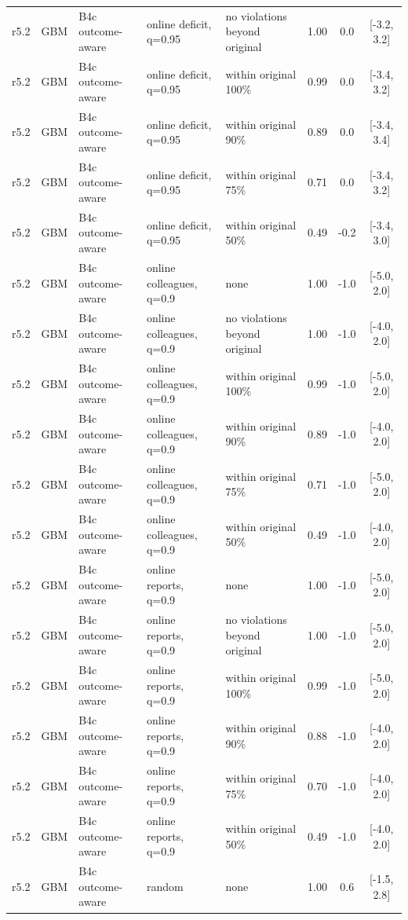 \documentclass[10pt,onecolumn,letterpaper]{article}
\begin{document}
\begin{longtable}{lllp{4.2cm}p{3.4cm}ccc}
r5.2 & GBM & B4c outcome-aware & online deficit, q=0.95 & no violations beyond original & 1.00 & 0.0 & [-3.2, 3.2] \\
r5.2 & GBM & B4c outcome-aware & online deficit, q=0.95 & within original 100\% & 0.99 & 0.0 & [-3.4, 3.2] \\
r5.2 & GBM & B4c outcome-aware & online deficit, q=0.95 & within original 90\% & 0.89 & 0.0 & [-3.4, 3.4] \\
r5.2 & GBM & B4c outcome-aware & online deficit, q=0.95 & within original 75\% & 0.71 & 0.0 & [-3.4, 3.2] \\
r5.2 & GBM & B4c outcome-aware & online deficit, q=0.95 & within original 50\% & 0.49 & -0.2 & [-3.4, 3.0] \\
r5.2 & GBM & B4c outcome-aware & online colleagues, q=0.9 & none & 1.00 & -1.0 & [-5.0, 2.0] \\
r5.2 & GBM & B4c outcome-aware & online colleagues, q=0.9 & no violations beyond original & 1.00 & -1.0 & [-4.0, 2.0] \\
r5.2 & GBM & B4c outcome-aware & online colleagues, q=0.9 & within original 100\% & 0.99 & -1.0 & [-5.0, 2.0] \\
r5.2 & GBM & B4c outcome-aware & online colleagues, q=0.9 & within original 90\% & 0.89 & -1.0 & [-4.0, 2.0] \\
r5.2 & GBM & B4c outcome-aware & online colleagues, q=0.9 & within original 75\% & 0.71 & -1.0 & [-5.0, 2.0] \\
r5.2 & GBM & B4c outcome-aware & online colleagues, q=0.9 & within original 50\% & 0.49 & -1.0 & [-4.0, 2.0] \\
r5.2 & GBM & B4c outcome-aware & online reports, q=0.9 & none & 1.00 & -1.0 & [-5.0, 2.0] \\
r5.2 & GBM & B4c outcome-aware & online reports, q=0.9 & no violations beyond original & 1.00 & -1.0 & [-5.0, 2.0] \\
r5.2 & GBM & B4c outcome-aware & online reports, q=0.9 & within original 100\% & 0.99 & -1.0 & [-5.0, 2.0] \\
r5.2 & GBM & B4c outcome-aware & online reports, q=0.9 & within original 90\% & 0.88 & -1.0 & [-4.0, 2.0] \\
r5.2 & GBM & B4c outcome-aware & online reports, q=0.9 & within original 75\% & 0.70 & -1.0 & [-4.0, 2.0] \\
r5.2 & GBM & B4c outcome-aware & online reports, q=0.9 & within original 50\% & 0.49 & -1.0 & [-4.0, 2.0] \\
r5.2 & GBM & B4c outcome-aware & random & none & 1.00 & 0.6 & [-1.5, 2.8] \\

\end{longtable}
\end{document}
